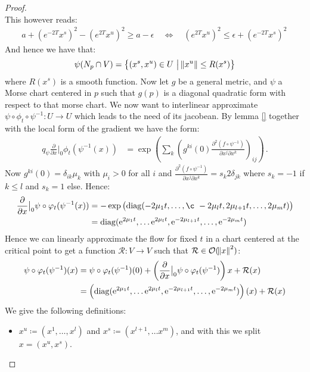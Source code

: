 \begin{proof}
\begin{equation}
\end{equation}
This however reads: 
\begin{align*}
     a+{( e^{-2T}x^s)}^2-(e^{2T}x^u)^2  \geq a-\epsilon  \quad \Leftrightarrow \quad (e^{2T}x^u)^2 \leq \epsilon+ {( e^{-2T}x^s)}^2 \, 
\end{align*}And hence we have that:
\begin{equation*}
    \psi(N_p\cap V)=\left\{(x^s,x^u)\in U ~\middle|~\norm{x^u}\leq R(x^s)\right\}
\end{equation*} where $R(x^s)$ is a smooth function. Now let $g$ be a general metric, and $\psi$ a Morse chart centered in $p$ such that $g(p)$ is a diagonal quadratic form with respect to that morse chart. We now want to interlinear approximate  $\psi\circ \phi_t \circ \psi^{-1}:U\to U$ which leads to the need of its jacobean. By lemma \ref{} together with the local form of the gradient we have the form:
\begin{align*}
	q_{\psi}	\frac{\partial}{\partial x}\big|_0 \phi_t(\psi^{-1}(x)	)
	&=\exp\left( \sum_k \left(g^{ki}(0) \frac{\partial ^2 (f\circ \psi^{-1})}{\partial x^j\partial x^k}\right)_{ij} \right) \, .
\end{align*} Now $g^{ki}(0)=\delta_{ik}\mu_k$ with $\mu_i>0$ for all $i$ and $\frac{\partial ^2 (f\circ \psi^{-1})}{\partial x^j\partial x^k}=s_{k} 2\delta_{jk}$ where $s_{k}=-1$ if $k\leq l$ and $s_k=1$ else. Hence: 
\begin{align*}
			\frac{\partial}{\partial x}\big|_0 \psi\circ \phi_t(\psi^{-1}(x)	)&=-\exp\left(\diag(-2\mu_1t,\dots,¸ -2\mu_lt,2\mu_{l+1}t,\dots,2\mu_mt)\right)\\ 
			&=\diag(\euler^{2\mu_{1}t},\dots \euler^{2\mu_{l}t},\euler^{-2\mu_{l+1}t},\dots,\euler^{-2\mu_{m}t}) 
\end{align*}
Hence we can linearly approximate the flow for fixed $t$ in a chart centered at the critical point to get a function $\mathcal{R}:V\to V$ such that $\mathcal{R}\in \mathcal{O}(\norm{x}^2)$:
\begin{align*}
	\psi\circ \varphi_t(\psi^{-1})(x)
	&=\psi\circ \varphi_t(\psi^{-1})(0)+\left( \frac{\partial}{\partial x}\big|_0	\psi\circ \varphi_t(\psi^{-1})\right) x+\mathcal{R}(x)\\
	&=\left( \mathrm{diag}(\mathrm{e}^{2\mu_{1}t},\dots \mathrm{e}^{2\mu_{l}t},\mathrm{e}^{-2\mu_{l+1}t},\dots,\mathrm{e}^{-2\mu_{m}t}) \right)(x) +\mathcal{R}(x)
\end{align*}
We give the following definitions: 
\begin{itemize}
\item $x^u\coloneq (x^1,\dots,x^l)$ and $x^s \coloneq (x^{l+1},\dots x^m)$, and with this we split $x=(x^u,x^s)$.

\end{itemize}
\end{proof}
